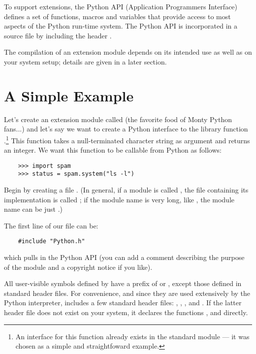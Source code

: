 \documentclass[twoside,openright]{report}
\begin{document}
To support extensions, the Python API (Application Programmers
Interface) defines a set of functions, macros and variables that
provide access to most aspects of the Python run-time system.  The
Python API is incorporated in a \C{} source file by including the header
.

The compilation of an extension module depends on its intended use as
well as on your system setup; details are given in a later section.


\section{A Simple Example}

Let's create an extension module called  (the favorite food
of Monty Python fans...) and let's say we want to create a Python
interface to the \C{} library function .\footnote{An
interface for this function already exists in the standard module
 --- it was chosen as a simple and straightfoward example.}
This function takes a null-terminated character string as argument and
returns an integer.  We want this function to be callable from Python
as follows:

\bcode\begin{verbatim}
    >>> import spam
    >>> status = spam.system("ls -l")
\end{verbatim}\ecode
%
Begin by creating a file .  (In general, if a
module is called , the \C{} file containing its implementation
is called ; if the module name is very long, like
, the module name can be just .)

The first line of our file can be:

\bcode\begin{verbatim}
    #include "Python.h"
\end{verbatim}\ecode
%
which pulls in the Python API (you can add a comment describing the
purpose of the module and a copyright notice if you like).

All user-visible symbols defined by  have a prefix of
 or , except those defined in standard header files.
For convenience, and since they are used extensively by the Python
interpreter,  includes a few standard header files:
, , , and
.  If the latter header file does not exist on your
system, it declares the functions ,  and
 directly.
\end{document}
